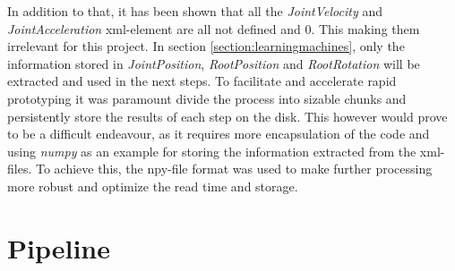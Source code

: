 			In addition to that, it has been shown that all the \textit{JointVelocity} and \textit{JointAcceleration} xml-element are all not defined and 0. This making them irrelevant for this project. In section \ref{section:learningmachines}, only the information stored in \textit{JointPosition}, \textit{RootPosition} and \textit{RootRotation} will be extracted and used in the next steps. To facilitate and accelerate rapid prototyping it was paramount divide the process into sizable chunks and persistently store the results of each step on the disk. This however would prove to be a difficult endeavour, as it requires more encapsulation of the code and using \textit{numpy} as an example for storing the information extracted from the xml-files. To achieve this, the npy-file format was used to make further processing more robust and optimize the read time and storage.
	\section{Pipeline}\label{sec:pipeline}
		
